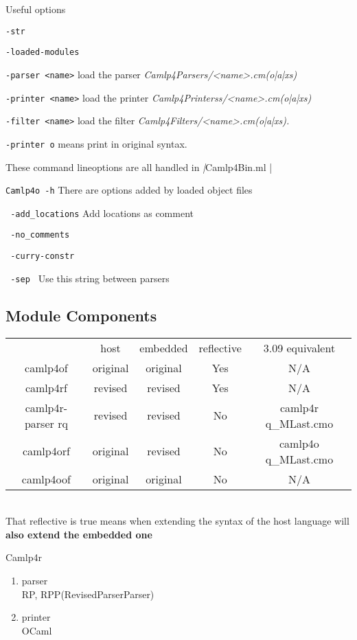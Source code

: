 Useful options 

\verb|-str|

\verb|-loaded-modules|

\verb|-parser <name>| load the parser \textit{Camlp4Parsers/<name>.cm(o|a|xs)}


\verb|-printer <name>| load the printer
\textit{Camlp4Printerss/<name>.cm(o|a|xs)}

\verb|-filter <name>| load the filter 
\textit{Camlp4Filters/<name>.cm(o|a|xs).}


\verb|-printer o| means print in original syntax. 


These command lineoptions are all handled in \emph|Camlp4Bin.ml |

\verb|Camlp4o -h| 
There are options added by loaded object files


\verb| -add_locations| Add locations as comment


\verb| -no_comments|


\verb| -curry-constr |


\verb| -sep | Use this string between parsers 




\subsection{Module Components}

  \begin{tabular}{|c|c|c|c|c|}
    \hline
                      & host     & embedded & reflective & 3.09 equivalent     \\
    camlp4of          & original & original & Yes        & N/A                 \\
    camlp4rf          & revised  & revised  & Yes        & N/A                 \\
    camlp4r-parser rq & revised  & revised  & No         & camlp4r q\_MLast.cmo \\
    camlp4orf         & original & revised  & No         & camlp4o q\_MLast.cmo \\
    camlp4oof         & original & original & No         & N/A                 \\
    \hline
  \end{tabular} \\

That reflective is true means when extending the syntax of the host
language will \textbf{ also extend the embedded one}

  
Camlp4r
    \begin{enumerate}
    \item parser \\
      RP, RPP(RevisedParserParser)
    \item printer \\
      OCaml
    \end{enumerate}


